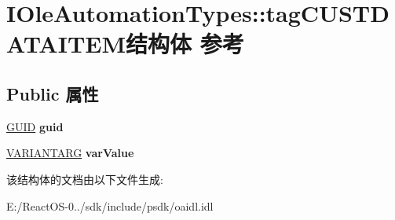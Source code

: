 \hypertarget{struct_i_ole_automation_types_1_1tag_c_u_s_t_d_a_t_a_i_t_e_m}{}\section{I\+Ole\+Automation\+Types\+:\+:tag\+C\+U\+S\+T\+D\+A\+T\+A\+I\+T\+E\+M结构体 参考}
\label{struct_i_ole_automation_types_1_1tag_c_u_s_t_d_a_t_a_i_t_e_m}
\subsection*{Public 属性}
\begin{DoxyCompactItemize}
\item 
\mbox{\label{struct_i_ole_automation_types_1_1tag_c_u_s_t_d_a_t_a_i_t_e_m_a81ad39f462340f3dbde78126bbdd4558}} 
\hyperlink{interface_g_u_i_d}{G\+U\+ID} {\bfseries guid}
\item 
\mbox{\label{struct_i_ole_automation_types_1_1tag_c_u_s_t_d_a_t_a_i_t_e_m_a230f9701f735f2083d89991f6b6d7ebc}} 
\hyperlink{structtag_v_a_r_i_a_n_t}{V\+A\+R\+I\+A\+N\+T\+A\+RG} {\bfseries var\+Value}
\end{DoxyCompactItemize}


该结构体的文档由以下文件生成\+:\begin{DoxyCompactItemize}
\item 
E\+:/\+React\+O\+S-\/0../sdk/include/psdk/oaidl.\+idl\end{DoxyCompactItemize}
